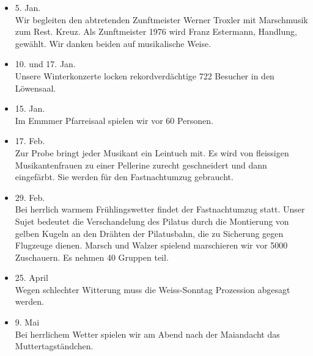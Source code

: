 \begin{multicols}{2}


    \begin{itemize}

        \item[]5. Jan.\\
        Wir begleiten den abtretenden Zunftmeister Werner Troxler mit
        Marschmusik zum Rest. Kreuz. Als Zunftmeister 1976 wird Franz Estermann,
        Handlung, gewählt. Wir danken beiden auf musikalische Weise.

        \item[]10. und 17. Jan.\\
        Unsere Winterkonzerte locken rekordverdächtige 722 Besucher in den
        Löwensaal.

        \item[]15. Jan.\\
        Im Emmmer Pfarreisaal spielen wir vor 60 Personen.

        \item[]17. Feb.\\
        Zur Probe bringt jeder Musikant ein Leintuch mit. Es wird von fleissigen
        Musikantenfrauen zu einer Pellerine zurecht geschneidert und dann
        eingefärbt. Sie werden für den Fastnachtumzug gebraucht.

        \item[]29. Feb.\\
        Bei herrlich warmem Frühlingswetter findet der Fastnachtumzug statt.
        Unser Sujet bedeutet die Verschandelung des Pilatus durch die Montierung
        von gelben Kugeln an den Drähten der Pilatusbahn, die zu Sicherung gegen
        Flugzeuge dienen. Marsch und Walzer spielend marschieren wir vor 5000
        Zuschauern. Es nehmen 40 Gruppen teil.

        \item[]25. April\\
        Wegen schlechter Witterung muss die Weiss-Sonntag Prozession abgesagt
        werden.

        \item[]9. Mai\\
        Bei herrlichem Wetter spielen wir am Abend nach der Maiandacht das
        Muttertagständchen.


\end{itemize}
\end{multicols}
